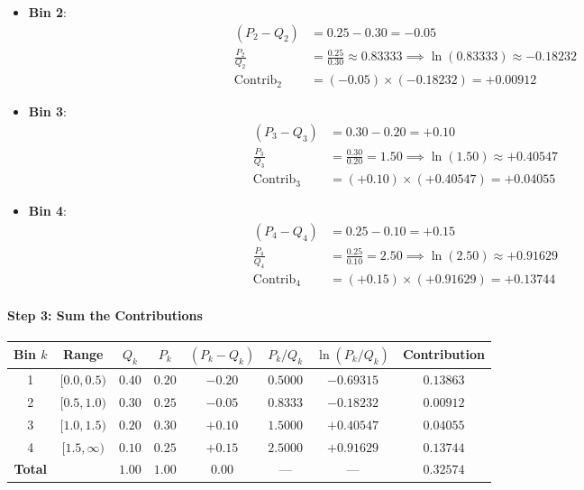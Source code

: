 \begin{example}
\begin{itemize}
    \item \textbf{Bin 2}:
    \begin{align*}
    (P_2 - Q_2) &= 0.25 - 0.30 = -0.05 \\
    \frac{P_2}{Q_2} &= \frac{0.25}{0.30} \approx 0.83333 \implies \ln(0.83333) \approx -0.18232 \\
    \text{Contrib}_2 &= (-0.05) \times (-0.18232) = \mathbf{+0.00912}
    \end{align*}

    \item \textbf{Bin 3}:
    \begin{align*}
    (P_3 - Q_3) &= 0.30 - 0.20 = +0.10 \\
    \frac{P_3}{Q_3} &= \frac{0.30}{0.20} = 1.50 \implies \ln(1.50) \approx +0.40547 \\
    \text{Contrib}_3 &= (+0.10) \times (+0.40547) = \mathbf{+0.04055}
    \end{align*}

    \item \textbf{Bin 4}:
    \begin{align*}
    (P_4 - Q_4) &= 0.25 - 0.10 = +0.15 \\
    \frac{P_4}{Q_4} &= \frac{0.25}{0.10} = 2.50 \implies \ln(2.50) \approx +0.91629 \\
    \text{Contrib}_4 &= (+0.15) \times (+0.91629) = \mathbf{+0.13744}
    \end{align*}
\end{itemize}

\paragraph{Step 3: Sum the Contributions}
\begin{center}
\small
\begin{tabular}{@{}cccccccc@{}}
\toprule
\textbf{Bin $k$} & \textbf{Range} & $Q_k$ & $P_k$ & $(P_k - Q_k)$ & $P_k / Q_k$ & $\ln(P_k / Q_k)$ & \textbf{Contribution} \\ \midrule
1 & $[0.0, 0.5)$ & $0.40$ & $0.20$ & $-0.20$ & $0.5000$ & $-0.69315$ & $0.13863$ \\
2 & $[0.5, 1.0)$ & $0.30$ & $0.25$ & $-0.05$ & $0.8333$ & $-0.18232$ & $0.00912$ \\
3 & $[1.0, 1.5)$ & $0.20$ & $0.30$ & $+0.10$ & $1.5000$ & $+0.40547$ & $0.04055$ \\
4 & $[1.5, \infty)$ & $0.10$ & $0.25$ & $+0.15$ & $2.5000$ & $+0.91629$ & $0.13744$ \\ \midrule
\textbf{Total} & & $1.00$ & $1.00$ & $0.00$ & --- & --- & $\mathbf{0.32574}$ \\ \bottomrule
\end{tabular}
\end{center}


\end{example}
